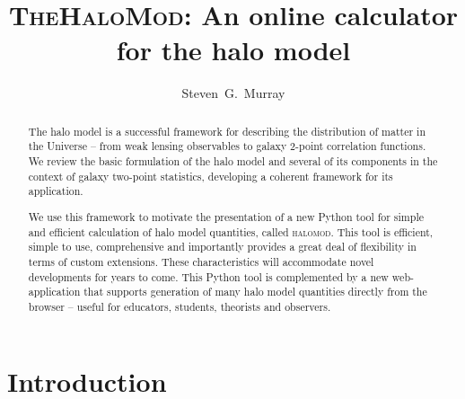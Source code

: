 \documentclass[5p]{elsarticle}
\newcommand{\halomod}{\textsc{halomod}}
\begin{document}
\begin{frontmatter}

\title{\textsc{TheHaloMod}: An online calculator for the halo model}

\author{Steven~G.~Murray}
\address{Arizona State University, Tempe, AZ, USA}



\begin{abstract}
The halo model is a successful framework for describing the distribution of matter in the Universe -- from weak lensing observables to galaxy 2-point correlation functions. We review the basic formulation of the halo model and several of its components in the context of galaxy two-point statistics, developing a coherent framework for its application.

We use this framework to motivate the presentation of a new Python tool for simple and efficient calculation of halo model quantities, called \halomod. This tool is efficient, simple to use, comprehensive and importantly provides a great deal of flexibility in terms of custom extensions. These characteristics will accommodate novel developments for years to come.
This Python tool is complemented by a new web-application that supports generation of many halo model quantities directly from the browser -- useful for educators, students, theorists and observers.

\end{abstract}

\begin{keyword}

\end{keyword}

\end{frontmatter}


\section{Introduction}
\end{document}
